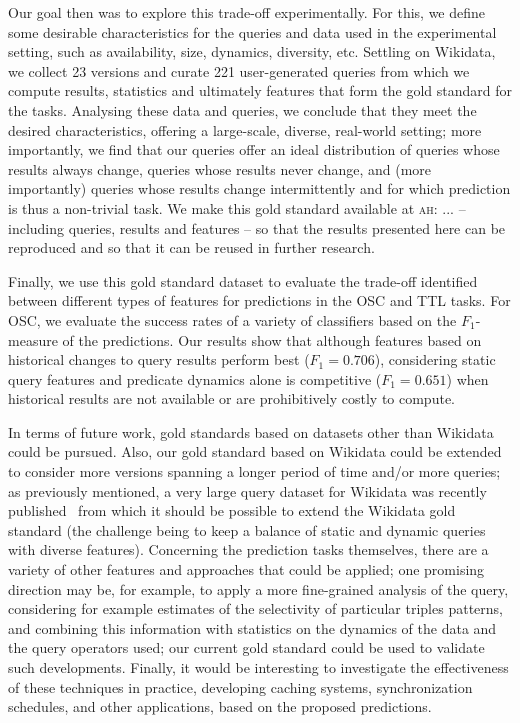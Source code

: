 \documentclass[runningheads]{llncs}
\newcommand{\ah}[1]{{\color{blue}\textsc{ah:} #1}}
\begin{document}
Our goal then was to explore this trade-off experimentally. For this, we define some desirable characteristics for the queries and data used in the experimental setting, such as availability, size, dynamics, diversity, etc. Settling on Wikidata, we collect 23 versions and curate 221 user-generated queries from which we compute results, statistics and ultimately features that form the gold standard for the tasks. Analysing these data and queries, we conclude that they meet the desired characteristics, offering a large-scale, diverse, real-world setting; more importantly, we find that our queries offer an ideal distribution of queries whose results always change, queries whose results never change, and (more importantly) queries whose results change intermittently and for which prediction is thus a non-trivial task. We make this gold standard available at \ah{...} -- including queries, results and features -- so that the results presented here can be reproduced and so that it can be reused in further research.

Finally, we use this gold standard dataset to evaluate the trade-off identified between different types of features for predictions in the OSC and TTL tasks. For OSC, we evaluate the success rates of a variety of classifiers based on the $F_1$-measure of the predictions. Our results show that although features based on historical changes to query results perform best ($F_1 = 0.706$), considering static query features and predicate dynamics alone is competitive ($F_1 =0.651$) when historical results are not available or are prohibitively costly to compute.    

In terms of future work, gold standards based on datasets other than Wikidata could be pursued. Also, our gold standard based on Wikidata could be extended to consider more versions spanning a longer period of time and/or more queries; as previously mentioned, a very large query dataset for Wikidata was recently published~\cite{MalyshevKGGB18} from which it should be possible to extend the Wikidata gold standard (the challenge being to keep a balance of static and dynamic queries with diverse features). Concerning the prediction tasks themselves, there are a variety of other features and approaches that could be applied; one promising direction may be, for example, to apply a more fine-grained analysis of the query, considering for example estimates of the selectivity of particular triples patterns, and combining this information with statistics on the dynamics of the data and the query operators used; our current gold standard could be used to validate such developments. Finally, it would be interesting to investigate the effectiveness of these techniques in practice, developing caching systems, synchronization schedules, and other applications, based on the proposed predictions.



\end{document}
